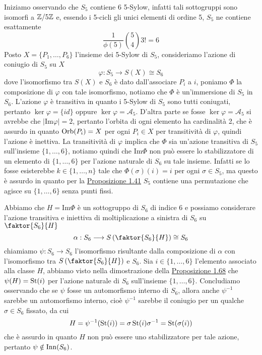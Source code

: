 \documentclass[11pt]{scrartcl}
\begin{document}
Iniziamo osservando che $S_5$ contiene 6 5-Sylow, infatti tali sottogruppi 
sono isomorfi a $\mathbb{Z}/{5}\mathbb{Z}$ e, essendo i 5-cicli gli unici elementi di ordine 5,
$S_5$ ne contiene esattamente 
\[
    \frac{1}{\phi(5)} \binom{5}{4}3! = 6
\]
Posto $X = \{P_1, \ldots, P_6\}$ l'insieme dei 5-Sylow di $S_5$, consideriamo l'azione di coniugio 
di $S_5$ su $X$
\[
    \varphi: S_5 \longrightarrow S(X) \cong S_6
\]
dove l'isomorfismo tra $S(X)$ e $S_6$ è dato dall'associare $P_i$ a $i$, 
poniamo $\Phi$ la composizione di $\varphi$ con tale isomorfismo, notiamo
che $\Phi$ è un'immersione di $S_5$ in $S_6$. L'azione 
$\varphi$ è transitiva in quanto i 5-Sylow di $S_5$ sono tutti coniugati,
pertanto $\ker\varphi = \{id\}$ oppure $\ker\varphi = \mathcal{A}_5$. D'altra parte
se fosse $\ker\varphi = \mathcal{A}_5$ si avrebbe che $|\mathrm{Im}\varphi| = 2$,
pertanto l'orbita di ogni elemento ha cardinalità 2, che è assurdo in quanto
$\operatorname{Orb}(P_i) = X$ per ogni $P_i \in X$ per transitività di $\varphi$, quindi l'azione
è inettiva.\newline
La transitività di $\varphi$ implica che $\Phi$ sia un'azione transitiva
di $S_5$ sull'insieme $\{1, \ldots, 6\}$, notiamo quindi che $\mathrm{Im}\Phi$
non può essere lo stabilizzatore di un elemento di $\{1, \ldots, 6\}$
per l'azione naturale di $S_6$ su tale insieme. Infatti se lo fosse esisterebbe
$k \in \{1, \ldots, n\}$ tale che $\Phi(\sigma)(i) = i$ per ogni $\sigma \in S_5$,
ma questo è assurdo in quanto per la \hyperref[prop1.41]{Proposizione 1.41} 
$S_5$ contiene una permutazione che agisce su $\{1, \ldots, 6\}$ senza punti
fissi.

Abbiamo che $H = \mathrm{Im}\Phi$ è un sottogruppo di $S_6$ di indice $6$ e possiamo
considerare l'azione transitiva e iniettiva di moltiplicazione a sinistra di $S_6$ su 
$\faktor{S_6}{H}$
\[
    \alpha: S_6\longrightarrow S\left(\faktor{S_6}{H}\right) \cong S_6
\]
chiamiamo $\psi: S_6\longrightarrow S_6$ l'isomorfismo risultante dalla
composizione di $\alpha$ con l'isomorfismo tra $S\left(\faktor{S_6}{H}\right)$
e $S_6$. Sia $i \in \{1, \ldots, 6\}$ l'elemento associato alla classe $H$,
abbiamo visto nella dimostrazione della \hyperref[prop1.68]{Proposizione 1.68}
che $\psi(H) = \operatorname{St}(i)$ per l'azione naturale di $S_6$ sull'insieme $\{1, \ldots, 6\}$.
Concludiamo osservando che se $\psi$ fosse un automorfismo interno di $S_6$,
allora anche $\psi^{-1}$ sarebbe un automorfismo interno, cioè $\psi^{-1}$
sarebbe il coniugio per un qualche $\sigma \in S_6$ fissato, da cui
\[
    H = \psi^{-1}(\operatorname{St}(i)) = \sigma\operatorname{St}(i)\sigma^{-1} = \operatorname{St}(\sigma(i))
\]
che è assurdo in quanto $H$ non può essere uno stabilizzatore per tale azione,
pertanto $\psi \notin \operatorname{Inn}(S_6)$.
\end{document}
